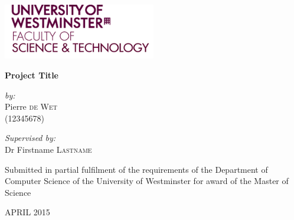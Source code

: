\begin{titlepage}

\includegraphics[width=0.5\textwidth]{./images/WestminsterLogo}~\\[1cm]


\begin{center}
{ \huge \bfseries Project Title \\[0.4cm] }

\noindent
\begin{minipage}{0.4\textwidth}
	 \begin{center}
	 \large
		\emph{by:}\\
		Pierre \textsc{de Wet}\\
		(12345678)
	\end{center}
	\end{minipage}
\vfill
	 \begin{minipage}{0.4\textwidth}
	 \begin{center}
		 \large
			\emph{Supervised by:} \\
			Dr Firstname \textsc{Lastname}
	\end{center}	
	\end{minipage}
\vfill

	\begin{minipage}{0.6\textwidth}
Submitted in partial fulfilment of the requirements of
the Department of Computer Science
of the University of Westminster
for award of the Master of Science\\
	\end{minipage}
\vfill
{\large APRIL 2015}\\

\end{center}
\end{titlepage}